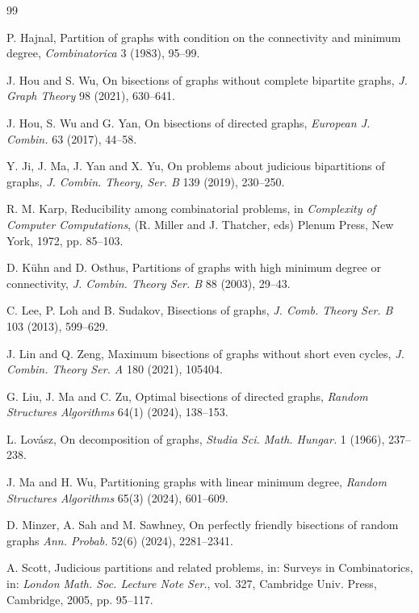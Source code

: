 \documentclass{aic}
\begin{document}
\begin{thebibliography}{99}
		
		P. Hajnal, Partition of graphs with condition on the connectivity and minimum degree,
		\emph{Combinatorica} 3 (1983), 95--99.
		
		
		
		J. Hou and S. Wu,
		On bisections of graphs without complete bipartite graphs,
		\emph{J. Graph Theory} 98 (2021), 630--641.
		
		
		J. Hou, S. Wu and G. Yan,
		On bisections of directed graphs,
		\emph{European J. Combin.} 63 (2017), 44--58.
		
		Y. Ji, J. Ma, J. Yan and X. Yu,
		On problems about judicious bipartitions of graphs,
		\emph{J. Combin. Theory, Ser. B} 139 (2019), 230--250.
		
		
		R. M. Karp, Reducibility among combinatorial problems,
		in \emph{Complexity of Computer Computations}, (R. Miller and J. Thatcher, eds) Plenum Press, New York, 1972, pp. 85--103.
		
		D. K\"uhn and D. Osthus, Partitions of graphs with high minimum degree or connectivity,
		\emph{J. Combin. Theory Ser. B} 88 (2003), 29--43.
		
		
		C. Lee, P. Loh and B. Sudakov,
		Bisections of graphs,
		\emph{J. Comb. Theory Ser. B} 103 (2013), 599--629.
		
		
		J. Lin and Q. Zeng,
		Maximum bisections of graphs without short even cycles,
		\emph{J. Combin. Theory Ser. A} 180 (2021), 105404.
		
		
		
		
		G. Liu, J. Ma and C. Zu,
		Optimal bisections of directed graphs,
		\emph{Random Structures Algorithms} 64(1) (2024), 138--153.
		
		
		L. Lov\'asz, On decomposition of graphs, \emph{Studia Sci. Math. Hungar.} 1 (1966), 237--238.
		
		
		
		
		J. Ma and H. Wu,
		Partitioning graphs with linear minimum degree,
		\emph{Random Structures Algorithms} 65(3) (2024), 601--609.
		
		
		D. Minzer, A. Sah and M. Sawhney,
		On perfectly friendly bisections of random graphs
		\emph{Ann. Probab.} 52(6) (2024), 2281--2341.
		
		
		A. Scott, Judicious partitions and related problems, in: Surveys in Combinatorics,
		in: \emph{London Math. Soc. Lecture Note Ser.}, vol. 327, Cambridge Univ. Press, Cambridge, 2005, pp. 95--117.
		

\end{thebibliography}
\end{document}
